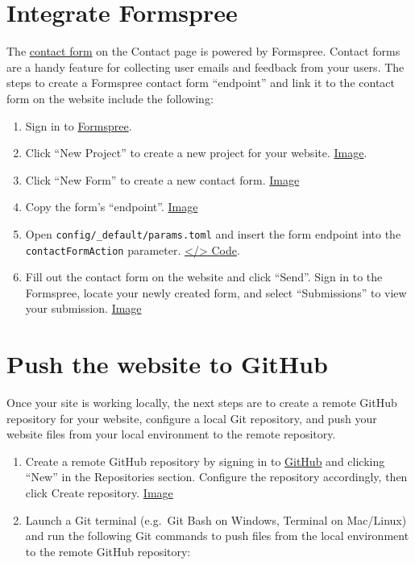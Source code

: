 \documentclass[
]{book}
\begin{document}
\hypertarget{integrate-formspree}{%
\section{Integrate Formspree}\label{integrate-formspree}}

The \href{https://r4sites-anatole.netlify.app/contact/}{contact form} on the Contact page is powered by Formspree. Contact forms are a handy feature for collecting user emails and feedback from your users. The steps to create a Formspree contact form ``endpoint'' and link it to the contact form on the website include the following:

\begin{enumerate}
\def\labelenumi{\arabic{enumi}.}
\item
  Sign in to \href{https://formspree.io/login}{Formspree}.
\item
  Click ``New Project'' to create a new project for your website. \href{https://i.imgur.com/jZnrcVL.png}{Image}.
\item
  Click ``New Form'' to create a new contact form. \href{https://i.imgur.com/OYqo3Js.png}{Image}
\item
  Copy the form's ``endpoint''. \href{https://i.imgur.com/2S2HVO6.png}{Image}
\item
  Open \texttt{config/\_default/params.toml} and insert the form endpoint into the \texttt{contactFormAction} parameter. \href{https://github.com/dannymorris/r4sites-demo/blob/master/config/_default/params.toml\#L18-L19}{\textless/\textgreater{} Code}.
\item
  Fill out the contact form on the website and click ``Send''. Sign in to the Formspree, locate your newly created form, and select ``Submissions'' to view your submission. \href{https://i.imgur.com/zua7Wuh.png}{Image}
\end{enumerate}

\hypertarget{push-demo}{%
\section{Push the website to GitHub}\label{push-demo}}

Once your site is working locally, the next steps are to create a remote GitHub repository for your website, configure a local Git repository, and push your website files from your local environment to the remote repository.

\begin{enumerate}
\def\labelenumi{\arabic{enumi}.}
\item
  Create a remote GitHub repository by signing in to \href{https://github.com/}{GitHub} and clicking ``New'' in the Repositories section. Configure the repository accordingly, then click Create repository. \href{https://i.imgur.com/dnmI973.png}{Image}
\item
  Launch a Git terminal (e.g.~Git Bash on Windows, Terminal on Mac/Linux) and run the following Git commands to push files from the local environment to the remote GitHub repository:
\end{enumerate}
\end{document}
